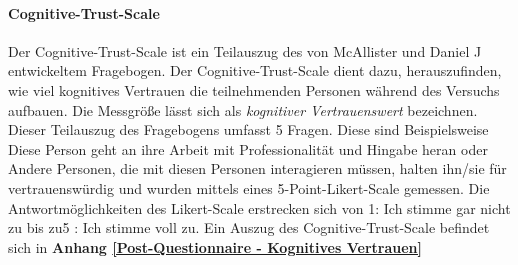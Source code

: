 \documentclass[a4paper,11pt]{article}%
\renewcommand{\\}{\vspace*{0.5\baselineskip} \newline}
\begin{document}
%			

		\paragraph{Cognitive-Trust-Scale}
Der Cognitive-Trust-Scale ist ein Teilauszug des von McAllister und Daniel J \citep[p.37]{mcallister1995affect} entwickeltem Fragebogen. Der Cognitive-Trust-Scale dient dazu, herauszufinden, wie viel kognitives Vertrauen die teilnehmenden Personen während des Versuchs aufbauen. Die Messgröße lässt sich als \dq{}\textit{kognitiver Vertrauenswert}\dq{} bezeichnen. Dieser Teilauszug des Fragebogens umfasst 5 Fragen. Diese sind Beispielsweise \dq{}Diese Person geht an ihre Arbeit mit Professionalität und Hingabe heran\dq{} oder \dq{}Andere Personen, die mit diesen Personen interagieren müssen, halten ihn/sie für vertrauenswürdig und wurden mittels eines 5-Point-Likert-Scale gemessen. Die Antwortmöglichkeiten des Likert-Scale erstrecken sich von \dq{}1: Ich stimme gar nicht zu \dq{} bis zu\dq{}5 : Ich stimme voll zu. 
Ein Auszug des Cognitive-Trust-Scale befindet sich in \textbf{Anhang \ref{Post-Questionnaire - Kognitives Vertrauen}}

  

\end{document}
